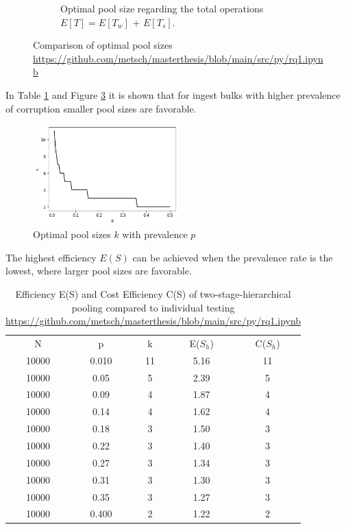 \begin{figure}[b]
\begin{subfigure}{6cm}
        \caption{Optimal pool size regarding the total operations $E[T] = E[T_w]$ + $E[T_s]$.}\label{fig:expected_operations}
    \end{subfigure}
    \caption{Comparison of optimal pool sizes \url{https://github.com/metsch/masterthesis/blob/main/src/py/rq1.ipynb}}%
    \label{fig:optimal_pool_size}%
\end{figure}
In Table \ref{tb:expected costs} and Figure \ref{fig:pool-sizes} it is shown that for ingest bulks with higher prevalence of corruption smaller pool sizes are favorable.
\begin{figure}[h]%
    \centering
    \caption{Optimal pool sizes $k$ with prevalence $p$}\label{fig:pool-sizes}
    \includegraphics[width=0.5\textwidth]{graphics/poolsizes.png}
\end{figure}
The highest efficiency $E(S)$ can be achieved when the prevalence rate is the lowest, where larger pool sizes are favorable.
\begin{table}[h]
    \caption{Efficiency E(S) and Cost Efficiency C(S) of two-stage-hierarchical pooling compared to individual testing \url{https://github.com/metsch/masterthesis/blob/main/src/py/rq1.ipynb}}
    \centering
    \begin{tabular}{ c c c c c}
    \label{tb:expected costs}
     N & p & k & E($S_h$) & C($S_h$) \\
     10000 & 0.010 & 11 & 5.16 & 11 \\ 
     \hline
     10000 & 0.05 & 5 & 2.39 & 5 \\  
     \hline
     10000 & 0.09 & 4 & 1.87 & 4 \\  
     \hline
     10000 & 0.14 & 4 & 1.62 & 4 \\  
     \hline
     10000 & 0.18 & 3 & 1.50 & 3  \\
     \hline
     10000 & 0.22 & 3 & 1.40 & 3  \\
     \hline
     10000 & 0.27 & 3 & 1.34 & 3  \\
     \hline
     10000 & 0.31 & 3 & 1.30 & 3  \\
     \hline
     10000 & 0.35 & 3 & 1.27 & 3  \\
     \hline
     10000 & 0.400 & 2 & 1.22 & 2  
    \end{tabular}
\end{table}

